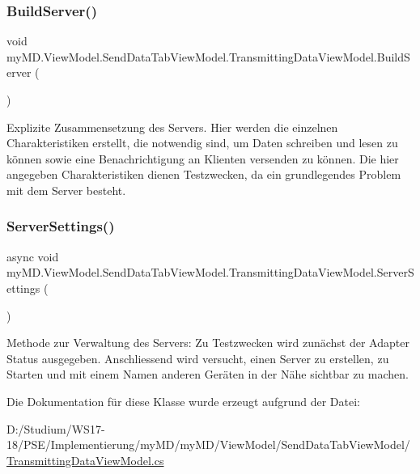 \subsubsection{\texorpdfstring{Build\+Server()}{BuildServer()}}
{\footnotesize\ttfamily void my\+M\+D.\+View\+Model.\+Send\+Data\+Tab\+View\+Model.\+Transmitting\+Data\+View\+Model.\+Build\+Server (\begin{DoxyParamCaption}{ }\end{DoxyParamCaption})}



Explizite Zusammensetzung des Servers. Hier werden die einzelnen Charakteristiken erstellt, die notwendig sind, um Daten schreiben und lesen zu können sowie eine Benachrichtigung an Klienten versenden zu können. Die hier angegeben Charakteristiken dienen Testzwecken, da ein grundlegendes Problem mit dem Server besteht. 

\mbox{\label{classmy_m_d_1_1_view_model_1_1_send_data_tab_view_model_1_1_transmitting_data_view_model_a5de8914eeb10e78166ef2a0c6bc65af4}} 
\subsubsection{\texorpdfstring{Server\+Settings()}{ServerSettings()}}
{\footnotesize\ttfamily async void my\+M\+D.\+View\+Model.\+Send\+Data\+Tab\+View\+Model.\+Transmitting\+Data\+View\+Model.\+Server\+Settings (\begin{DoxyParamCaption}{ }\end{DoxyParamCaption})}



Methode zur Verwaltung des Servers\+: Zu Testzwecken wird zunächst der Adapter Status ausgegeben. Anschliessend wird versucht, einen Server zu erstellen, zu Starten und mit einem Namen anderen Geräten in der Nähe sichtbar zu machen. 



Die Dokumentation für diese Klasse wurde erzeugt aufgrund der Datei\+:\begin{DoxyCompactItemize}
\item 
D\+:/\+Studium/\+W\+S17-\/18/\+P\+S\+E/\+Implementierung/my\+M\+D/my\+M\+D/\+View\+Model/\+Send\+Data\+Tab\+View\+Model/\mbox{\hyperlink{_transmitting_data_view_model_8cs}{Transmitting\+Data\+View\+Model.\+cs}}\end{DoxyCompactItemize}
